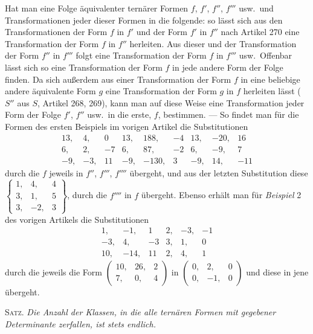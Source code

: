Hat man eine Folge äquivalenter ternärer Formen \(f\), \(f'\), \(f''\), \(f'''\) usw.\ und Transformationen jeder dieser Formen in die folgende: so lässt sich aus den Transformationen der Form \(f\) in \(f'\) und der Form \(f'\) in \(f''\) nach Artikel 270 eine Transformation der Form \(f\) in \(f''\) herleiten. Aus dieser und der Transformation der Form \(f''\) in \(f'''\) folgt eine Transformation der Form \(f\) in \(f'''\) usw.\ Offenbar lässt sich so eine Transformation der Form \(f\) in jede andere Form der Folge finden. Da sich außerdem aus einer Transformation der Form \(f\) in eine beliebige andere äquivalente Form \(g\) eine Transformation der Form \(g\) in \(f\) herleiten lässt (\(S''\) aus \(S\), Artikel 268, 269), kann man auf diese Weise eine Transformation jeder Form der Folge \(f'\), \(f''\) usw.\ in die erste, \(f\), bestimmen. --- So findet man für die Formen des ersten Beispiels im vorigen Artikel die Substitutionen
\[
\begin{array}{rrr|rrr|rrr}
13,&4,&0&13,&188,&-4&13,&-20,&16\\
6,&2,&-7&6,&87,&-2&6,&-9,&7\\
-9,&-3,&11&-9,&-130,&3&-9,&14,&-11
\end{array}
\]
durch die \(f\) jeweils in \(f''\), \(f'''\), \(f''''\) übergeht, und aus der letzten Substitution diese \(\left\{\begin{smallmatrix}1,&4,&4\\3,&1,&5\\3,&-2,&3\end{smallmatrix}\right\}\), durch die \(f''''\) in \(f\) übergeht. Ebenso erhält man für \emph{Beispiel} 2 des vorigen Artikels die Substitutionen
\[
\begin{array}{rrr|rrr}
1,&-1,&1&2,&-3,&-1\\
-3,&4,&-3&3,&1,&0\\
10,&-14,&11&2,&4,&1
\end{array}
\]
durch die jeweils die Form \(\left(\begin{smallmatrix}10,&26,&2\\7,&0,&4\end{smallmatrix}\right)\) in \(\left(\begin{smallmatrix}0,&2,&0\\0,&-1,&0\end{smallmatrix}\right)\) und diese in jene übergeht.

\textsc{Satz.} \emph{Die Anzahl der Klassen, in die alle ternären Formen mit gegebener Determinante zerfallen, ist stets endlich.}

